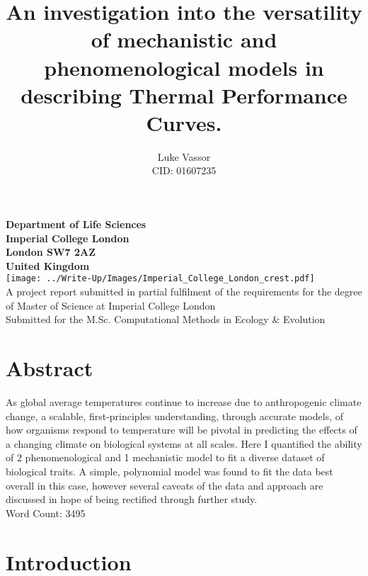 \documentclass[11pt]{article}
\title{\textbf{An investigation into the versatility of mechanistic and phenomenological models in describing Thermal Performance Curves.}}
\author{Luke Vassor \\ CID: 01607235}
\date{}
\begin{document}
    \maketitle    
    \begin{center}
        \textbf{Department of Life Sciences \\
                Imperial College London \\
                London SW7 2AZ \\
                United Kingdom \\}
        \vspace{10mm}
        \texttt{[image: ../Write-Up/Images/Imperial\_College\_London\_crest.pdf]} \\
        \vspace{10mm}
        A project report submitted in partial fulfilment of the requirements for the degree of Master of Science at Imperial College London \\
        Submitted for the M.Sc. Computational Methods in Ecology \& Evolution
    \end{center}
    \newpage
    \tableofcontents
    \newpage
    \section{Abstract}
    \linenumbers
        As global average temperatures continue to increase due to anthropogenic climate change, a scalable, first-principles understanding, through accurate models, of how organisms respond to temperature will be pivotal in predicting the effects of a changing climate on biological systems at all scales. Here I quantified the ability of 2 phenomenological and 1 mechanistic model to fit a diverse dataset of biological traits. A simple, polynomial model was found to fit the data best overall in this case, however several caveats of the data and approach are discussed in hope of being rectified through further study.
        \\
        Word Count: 3495
    \section{Introduction}
\end{document}
